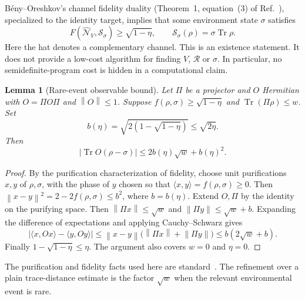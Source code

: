 \documentclass[11pt]{article}
\newtheorem{lemma}[theorem]{Lemma}
\newcommand{\tr}{\operatorname{Tr}}
\newcommand{\norm}[1]{\left\lVert#1\right\rVert}
\begin{document}
B\'eny--Oreshkov's channel fidelity duality (Theorem~1, equation~(3) of Ref.~\cite{BenyOreshkov}), specialized to the identity target, implies that some environment state $\sigma$ satisfies
\begin{equation}
 F(\widehat{\mathcal N}_V,\mathcal S_\sigma)\geq\sqrt{1-\eta},
 \qquad \mathcal S_\sigma(\rho)=\sigma\tr\rho.\label{eq:duality}
\end{equation}
Here the hat denotes a complementary channel. This is an existence statement. It does not provide a low-cost algorithm for finding $V$, $\mathcal R$ or $\sigma$. In particular, no semidefinite-program cost is hidden in a computational claim.

\begin{lemma}[Rare-event observable bound]\label{lem:rare}
Let $\Pi$ be a projector and $O$ Hermitian with $O=\Pi O\Pi$ and $\norm O\leq1$. Suppose $f(\rho,\sigma)\geq\sqrt{1-\eta}$ and $\tr(\Pi\rho)\leq w$. Set
\begin{equation}
 b(\eta)=\sqrt{2(1-\sqrt{1-\eta})}\leq\sqrt{2\eta}.
\end{equation}
Then
\begin{equation}
 |\tr O(\rho-\sigma)|\leq2b(\eta)\sqrt w+b(\eta)^2.\label{eq:rare}
\end{equation}
\end{lemma}
\begin{proof}
By the purification characterization of fidelity, choose unit purifications $x,y$ of $\rho,\sigma$, with the phase of $y$ chosen so that $\langle x,y\rangle=f(\rho,\sigma)\geq0$. Then $\norm{x-y}^2=2-2f(\rho,\sigma)\leq b^2$, where $b=b(\eta)$. Extend $O,\Pi$ by the identity on the purifying space. Then $\norm{\Pi x}\leq\sqrt w$ and $\norm{\Pi y}\leq\sqrt w+b$. Expanding the difference of expectations and applying Cauchy--Schwarz gives
\[
 |\langle x,Ox\rangle-\langle y,Oy\rangle|
 \leq\norm{x-y}\bigl(\norm{\Pi x}+\norm{\Pi y}\bigr)
 \leq b(2\sqrt w+b).
\]
Finally $1-\sqrt{1-\eta}\leq\eta$. The argument also covers $w=0$ and $\eta=0$.
\end{proof}
The purification and fidelity facts used here are standard~\cite{Watrous}. The refinement over a plain trace-distance estimate is the factor $\sqrt w$ when the relevant environmental event is rare.
\end{document}
